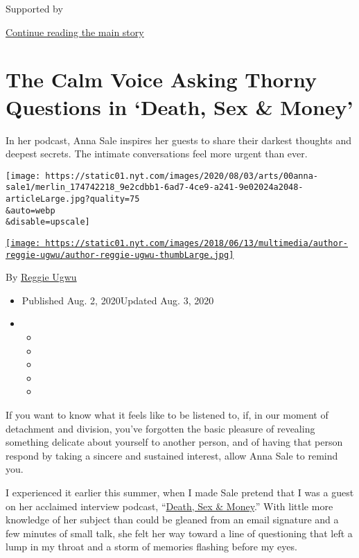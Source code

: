 Supported by

\protect\hyperlink{after-sponsor}{Continue reading the main story}

\hypertarget{the-calm-voice-asking-thorny-questions-in-death-sex--money}{%
\section{The Calm Voice Asking Thorny Questions in `Death, Sex \&
Money'}\label{the-calm-voice-asking-thorny-questions-in-death-sex--money}}

In her podcast, Anna Sale inspires her guests to share their darkest
thoughts and deepest secrets. The intimate conversations feel more
urgent than ever.

\texttt{[image: https://static01.nyt.com/images/2020/08/03/arts/00anna-sale1/merlin\_174742218\_9e2cdbb1-6ad7-4ce9-a241-9e02024a2048-articleLarge.jpg?quality=75\\\&auto=webp\\\&disable=upscale]}

\href{https://www.nytimes.com/by/reggie-ugwu}{\texttt{[image: https://static01.nyt.com/images/2018/06/13/multimedia/author-reggie-ugwu/author-reggie-ugwu-thumbLarge.jpg]}}

By \href{https://www.nytimes.com/by/reggie-ugwu}{Reggie Ugwu}

\begin{itemize}
\item
  Published Aug. 2, 2020Updated Aug. 3, 2020
\item
  \begin{itemize}
  \item
  \item
  \item
  \item
  \item
  \end{itemize}
\end{itemize}

If you want to know what it feels like to be listened to, if, in our
moment of detachment and division, you've forgotten the basic pleasure
of revealing something delicate about yourself to another person, and of
having that person respond by taking a sincere and sustained interest,
allow Anna Sale to remind you.

I experienced it earlier this summer, when I made Sale pretend that I
was a guest on her acclaimed interview podcast,
``\href{https://www.wnycstudios.org/podcasts/deathsexmoney}{Death, Sex
\& Money}.'' With little more knowledge of her subject than could be
gleaned from an email signature and a few minutes of small talk, she
felt her way toward a line of questioning that left a lump in my throat
and a storm of memories flashing before my eyes.

